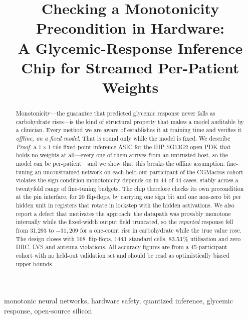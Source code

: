 \documentclass[conference]{IEEEtran}
\begin{document}
\title{Checking a Monotonicity Precondition in Hardware:\\
A Glycemic-Response Inference Chip for Streamed Per-Patient Weights}

\author{
}

\maketitle

\begin{abstract}
Monotonicity---the guarantee that predicted glycemic response never falls as
carbohydrate rises---is the kind of structural property that makes a model
auditable by a clinician. Every method we are aware of establishes it at
training time and verifies it \emph{offline, on a fixed model}. That is sound
only while the model is fixed. We describe \emph{Proof}, a $1\times1$-tile
fixed-point inference ASIC for the IHP SG13G2 open PDK that holds no weights at
all---every one of them arrives from an untrusted host, so the model can be
per-patient---and we show that this breaks the offline assumption: fine-tuning
an unconstrained network on each held-out participant of the CGMacros cohort
violates the sign condition monotonicity depends on in 44 of 44 cases, stably
across a twentyfold range of fine-tuning budgets. The chip therefore checks its
own precondition at the pin interface, for 20 flip-flops, by carrying one sign
bit and one non-zero bit per hidden unit in registers that rotate in lockstep
with the hidden activations. We also report a defect that motivates the
approach: the datapath was provably monotone internally while the fixed-width
output field truncated, so the \emph{reported} response fell from 31{,}293 to
$-31{,}209$ for a one-count rise in carbohydrate while the true value rose. The
design closes with 168~flip-flops, 1443~standard cells, 83.53\,\% utilisation
and zero DRC, LVS and antenna violations. All accuracy figures are from a
45-participant cohort with no held-out validation set and should be read as
optimistically biased upper bounds.
\end{abstract}

\begin{IEEEkeywords}
monotonic neural networks, hardware safety, quantized inference, glycemic
response, open-source silicon
\end{IEEEkeywords}
\end{document}
